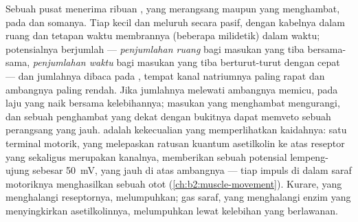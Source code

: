 \begin{proposition}\label{prop:b2:neurons-synapses:integration}
Sebuah  pusat menerima ribuan , yang merangsang maupun
yang menghambat, pada  dan somanya. Tiap  kecil dan meluruh secara pasif, dengan 
kabelnya dalam ruang dan tetapan waktu membrannya (beberapa milidetik)
dalam waktu; potensialnya berjumlah --- \emph{penjumlahan ruang} bagi
masukan yang tiba bersama-sama, \emph{penjumlahan waktu} bagi masukan
yang tiba berturut-turut dengan cepat --- dan jumlahnya dibaca pada
\emph{}, tempat kanal natriumnya paling rapat dan
ambangnya paling rendah. Jika jumlahnya melewati ambangnya 
memicu, pada laju yang naik bersama kelebihannya; masukan yang
menghambat mengurangi, dan sebuah  penghambat yang dekat dengan
bukitnya dapat memveto sebuah  perangsang yang jauh.  adalah kekecualian yang memperlihatkan kaidahnya: satu
terminal motorik, yang melepaskan ratusan kuantum asetilkolin ke atas
reseptor yang sekaligus merupakan kanalnya, memberikan sebuah potensial
lempeng-ujung sebesar \qty{50}{mV}, yang jauh di atas ambangnya --- tiap
impuls di dalam saraf motoriknya menghasilkan sebuah  otot
(\cref{ch:b2:muscle-movement}). Kurare, yang menghalangi reseptornya,
melumpuhkan; gas saraf, yang menghalangi enzim yang menyingkirkan
asetilkolinnya, melumpuhkan lewat kelebihan yang berlawanan.
\end{proposition}


